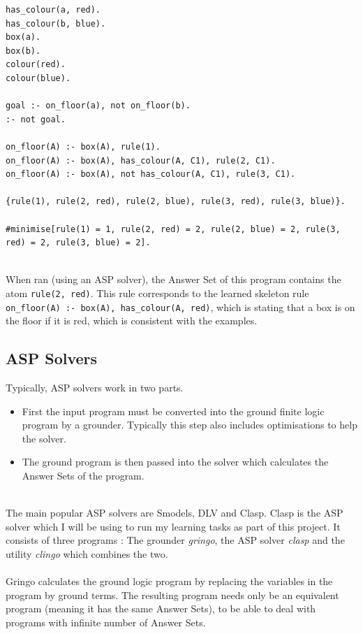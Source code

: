 \begin{lstlisting}
has_colour(a, red).
has_colour(b, blue).
box(a).
box(b).
colour(red).
colour(blue).

goal :- on_floor(a), not on_floor(b).
:- not goal.

on_floor(A) :- box(A), rule(1).
on_floor(A) :- box(A), has_colour(A, C1), rule(2, C1).
on_floor(A) :- box(A), not has_colour(A, C1), rule(3, C1).

{rule(1), rule(2, red), rule(2, blue), rule(3, red), rule(3, blue)}.

#minimise[rule(1) = 1, rule(2, red) = 2, rule(2, blue) = 2, rule(3, red) = 2, rule(3, blue) = 2].
\end{lstlisting}
\mbox{}\\
When ran (using an ASP solver), the Answer Set of this program contains the atom \lstinline!rule(2, red)!. This rule corresponds to the learned skeleton rule \lstinline!on_floor(A) :- box(A), has_colour(A, red)!, which is stating that a box is on the floor if it is red, which is consistent with the examples.

\subsection{ASP Solvers}

Typically, ASP solvers work in two parts.

\begin{itemize}
\item First the input program must be converted into the ground finite logic program by a grounder. Typically this step also includes optimisations to help the solver.
\item The ground program is then passed into the solver which calculates the Answer Sets of the program.
\end{itemize}
\mbox{}\\
The main popular ASP solvers are Smodels, DLV and Clasp. Clasp \cite{Gebser2007} is the ASP solver which I will be using to run my learning tasks as part of this project. It consists of three programs : The grounder \textit{gringo}, the ASP solver \textit{clasp} and the utility \textit{clingo} which combines the two.\\ \\
Gringo calculates the ground logic program by replacing the variables in the program by ground terms. The resulting program needs only be an equivalent program (meaning it has the same Answer Sets), to be able to deal with programs with infinite number of Answer Sets.

